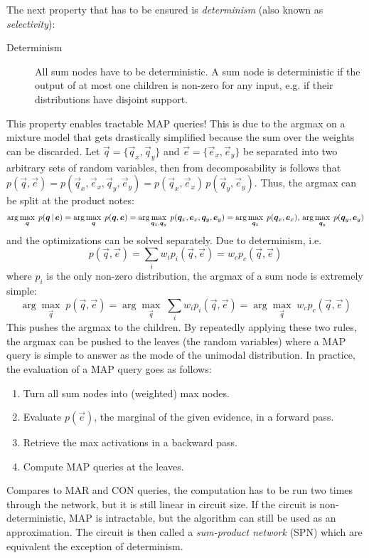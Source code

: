 			The next property that has to be ensured is \emph{determinism} (also known as \emph{selectivity}):
			\begin{description}
				\item[Determinism] All sum nodes have to be deterministic. A sum node is deterministic if the output of at most one children is non-zero for any input, e.g. if their distributions have disjoint support.
			\end{description}
			This property enables tractable MAP queries! This is due to the argmax on a mixture model that gets drastically simplified because the sum over the weights can be discarded. Let \( \vec{q} = \{ \vec{q}_x, \vec{q}_y \} \) and \( \vec{e} = \{ \vec{e}_x, \vec{e}_y \} \) be separated into two arbitrary sets of random variables, then from decomposability is follows that \( p(\vec{q}, \vec{e}) = p(\vec{q}_x, \vec{e}_x, \vec{q}_y, \vec{e}_y) = p(\vec{q}_x, \vec{e}_x) \, p(\vec{q}_y, \vec{e}_y) \). Thus, the argmax can be split at the product notes:
			\begin{equation}
				\arg\max_{\bm{q}} \; p(\bm{q} \,\vert\, \bm{e})
				= \arg\max_{\bm{q}} \; p(\bm{q}, \bm{e})
				= \arg\max_{\bm{q}_x, \bm{q}_y} \; p(\bm{q}_x, \bm{e}_x, \bm{q}_y, \bm{e}_y)
				= \arg\max_{\bm{q}_x} \; p(\bm{q}_x, \bm{e}_x),\, \arg\max_{\bm{q}_y} \; p(\bm{q}_y, \bm{e}_y)
			\end{equation}
			and the optimizations can be solved separately. Due to determinism, i.e.
			\begin{equation}
				p(\vec{q}, \vec{e}) = \sum_i w_i p_i(\vec{q}, \vec{e}) = w_c p_c(\vec{q}, \vec{e})
			\end{equation}
			where \(p_i\) is the only non-zero distribution, the argmax of a sum node is extremely simple:
			\begin{equation}
				\arg\max_{\vec{q}} \; p(\vec{q}, \vec{e})
				= \arg\max_{\vec{q}} \; \sum_i w_i p_i(\vec{q}, \vec{e})
				= \arg\max_{\vec{q}} \; w_c p_c(\vec{q}, \vec{e})
			\end{equation}
			This pushes the argmax to the children. By repeatedly applying these two rules, the argmax can be pushed to the leaves (the random variables) where a MAP query is simple to answer as the mode of the unimodal distribution. In practice, the evaluation of a MAP query goes as follows:
			\begin{enumerate}
				\item Turn all sum nodes into (weighted) max nodes.
				\item Evaluate \( p(\vec{e}) \), the marginal of the given evidence, in a forward pass.
				\item Retrieve the max activations in a backward pass.
				\item Compute MAP queries at the leaves.
			\end{enumerate}
			Compares to MAR and CON queries, the computation has to be run two times through the network, but it is still linear in circuit size. If the circuit is non-deterministic, MAP is intractable, but the algorithm can still be used as an approximation. The circuit is then called a \emph{sum-product network} (SPN) which are equivalent the exception of determinism.

